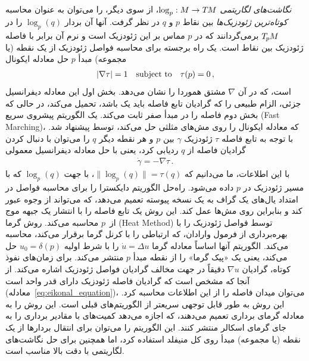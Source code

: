 \emph{نگاشت‌های لگاریتمی} $\log_p: M \to T\mkern-1.5muM$، از سوی دیگر، را می‌توان به عنوان محاسبه \emph{کوتاه‌ترین ژئودزیک‌ها} بین نقاط $p$ و $q$ در نظر گرفت.
آنها آن بردار $\log_p(q)$ را در $T_{\mkern-1.5mu p}\mkern-.5muM$ برمی‌گردانند که در $p$ مماس بر این ژئودزیک است و نرم آن برابر با فاصله ژئودزیک بین نقاط است.
یک راه برجسته برای محاسبه فواصل ژئودزیک از یک نقطه (یا مجموعه) مبدأ $p$ حل معادله ایکونال
\begin{align}\label{eq:eikonal_equation}
    |\nabla \tau| = 1
    \quad\textup{subject to}\quad
    \tau(p) = 0 \,,
\end{align}
است، که در آن $\nabla$ مشتق هموردا را نشان می‌دهد.
بخش اول این معادله دیفرانسیل جزئی، الزام طبیعی را که گرادیان تابع فاصله باید یک باشد، تحمیل می‌کند، در حالی که بخش دوم فاصله را در مبدأ صفر ثابت می‌کند.
یک الگوریتم پیشروی سریع (Fast Marching)، که معادله ایکونال را روی مش‌های مثلثی حل می‌کند، توسط \citet{kimmel1998computingGeodesics} پیشنهاد شد.
با توجه به تابع فاصله $\tau$ ژئودزیک $\gamma$ بین $p$ و هر نقطه دیگر $q$ را می‌توان با دنبال کردن گرادیان فاصله از $q$ ردیابی کرد، یعنی با حل معادله دیفرانسیل معمولی
\begin{align}
    \dot{\gamma} = -\nabla \tau \,.
\end{align}
با این اطلاعات، ما می‌دانیم که $\lVert\log_p(q)\rVert = \tau(q)$، با جهت $\log_p(q)$ که با مسیر ژئودزیک در $p$ داده می‌شود.
راه‌حل \citet{mitchell1987discrete} الگوریتم دایکسترا را برای محاسبه فواصل در امتداد یال‌های یک گراف به یک نسخه پیوسته تعمیم می‌دهد، که می‌تواند از وجوه عبور کند و بنابراین روی مش‌ها عمل کند.
این روش یک تابع فاصله را با انتشار یک جبهه موج از~$p$ محاسبه می‌کند.
روش گرما (Heat Method) توسط \citet{Crane2017HeatMethodDistance} فواصل ژئودزیک را با بهره‌برداری از فرمول وارادان، که ارتباطی را با کرنل گرما برقرار می‌کند، محاسبه می‌کند.
الگوریتم آنها اساساً معادله گرما $\dot{u} = \Delta u$ را با شرط اولیه $u_0 = \delta(p)$ حل می‌کند، یعنی یک «پیک گرما» را از نقطه مبدأ $p$ منتشر می‌کند.
برای زمان‌های نفوذ کوتاه، گرادیان $\nabla u$ دقیقاً در جهت مخالف گرادیان فواصل ژئودزیک اشاره می‌کند.
از آنجا که مشخص است که گرادیان فاصله ژئودزیک دارای قدر واحد است (معادله~\eqref{eq:eikonal_equation})، می‌توان میدان فاصله را از این اطلاعات محاسبه کرد.
این روش به طور قابل توجهی سریعتر از الگوریتم‌های قبلی است.
\citet{Sharp2019VectorHeatMethod} این روش را به معادله گرمای برداری تعمیم می‌دهند، که اجازه می‌دهد کمیت‌های با مقادیر برداری را به جای گرمای اسکالر منتشر کنند.
این الگوریتم را می‌توان برای انتقال بردارها از یک نقطه (یا مجموعه) مبدأ روی کل منیفلد استفاده کرد، اما همچنین برای حل نگاشت‌های لگاریتمی با دقت بالا مناسب است.